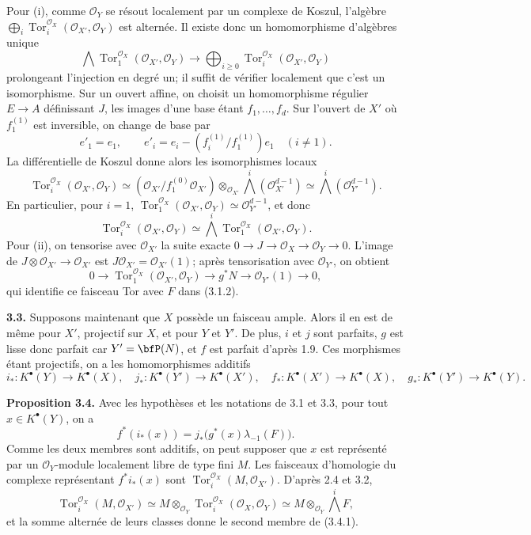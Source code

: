 \documentclass[11pt]{article}
\newcommand{\Tor}{\operatorname{Tor}}
\providecommand{\Tor}{\operatorname{Tor}}
\providecommand{\cO}{\mathcal O}
\begin{document}
Pour (i), comme \(\cO_Y\) se résout localement par un complexe de Koszul, l'algèbre \(\bigoplus_i\Tor_i^{\cO_X}(\cO_{X'},\cO_Y)\) est alternée. Il existe donc un homomorphisme d'algèbres unique
\begin{equation}\tag{3.2.1}
\bigwedge \Tor_1^{\cO_X}(\cO_{X'},\cO_Y)
\longrightarrow
\bigoplus_{i\ge0}\Tor_i^{\cO_X}(\cO_{X'},\cO_Y)
\end{equation}
prolongeant l'injection en degré un; il suffit de vérifier localement que c'est un isomorphisme. Sur un ouvert affine, on choisit un homomorphisme régulier \(E\to A\) définissant \(J\), les images d'une base étant \(f_1,\ldots,f_d\). Sur l'ouvert de \(X'\) où \(f_1^{(1)}\) est inversible, on change de base par
\[
e'_1=e_1,
\qquad
e'_i=e_i-(f_i^{(1)}/f_1^{(1)})e_1\quad(i\ne1).
\]
La différentielle de Koszul donne alors les isomorphismes locaux
\begin{equation}\tag{3.2.2}
\Tor_i^{\cO_X}(\cO_{X'},\cO_Y)
\simeq
(\cO_{X'}/f_1^{(0)}\cO_{X'})\otimes_{\cO_{X'}}
\bigwedge^i(\cO_{X'}^{d-1})
\simeq
\bigwedge^i(\cO_{Y'}^{d-1}).
\end{equation}
En particulier, pour \(i=1\), \(\Tor_1^{\cO_X}(\cO_{X'},\cO_Y)\simeq \cO_{Y'}^{d-1}\), et donc
\begin{equation}\tag{3.2.3}
\Tor_i^{\cO_X}(\cO_{X'},\cO_Y)
\simeq
\bigwedge^i\Tor_1^{\cO_X}(\cO_{X'},\cO_Y).
\end{equation}
Pour (ii), on tensorise avec \(\cO_{X'}\) la suite exacte \(0\to J\to\cO_X\to\cO_Y\to0\). L'image de \(J\otimes\cO_{X'}\to\cO_{X'}\) est \(J\cO_{X'}=\cO_{X'}(1)\); après tensorisation avec \(\cO_{Y'}\), on obtient
\begin{equation}\tag{3.2.4}
0\to \Tor_1^{\cO_X}(\cO_{X'},\cO_Y)\to g^*N\to\cO_{Y'}(1)
\to0,
\end{equation}
qui identifie ce faisceau Tor avec \(F\) dans (3.1.2).

\textbf{3.3.} Supposons maintenant que \(X\) possède un faisceau ample. Alors il en est de même pour \(X'\), projectif sur \(X\), et pour \(Y\) et \(Y'\). De plus, \(i\) et \(j\) sont parfaits, \(g\) est lisse donc parfait car \(Y'=\bfP(N)\), et \(f\) est parfait d'après 1.9. Ces morphismes étant projectifs, on a les homomorphismes additifs
\[
i_*:K^\bullet(Y)\to K^\bullet(X),\quad
j_*:K^\bullet(Y')\to K^\bullet(X'),\quad
f_*:K^\bullet(X')\to K^\bullet(X),\quad
g_*:K^\bullet(Y')\to K^\bullet(Y).
\]

\textbf{Proposition 3.4.} Avec les hypothèses et les notations de 3.1 et 3.3, pour tout \(x\in K^\bullet(Y)\), on a
\begin{equation}\tag{3.4.1}
f^*(i_*(x))=j_*\bigl(g^*(x)\lambda_{-1}(F)\bigr).
\end{equation}
Comme les deux membres sont additifs, on peut supposer que \(x\) est représenté par un \(\cO_Y\)-module localement libre de type fini \(M\). Les faisceaux d'homologie du complexe représentant \(f^*i_*(x)\) sont \(\Tor_i^{\cO_X}(M,\cO_{X'})\). D'après 2.4 et 3.2,
\[
\Tor_i^{\cO_X}(M,\cO_{X'})
\simeq M\otimes_{\cO_Y}\Tor_i^{\cO_X}(\cO_X,\cO_Y)
\simeq M\otimes_{\cO_Y}\bigwedge^iF,
\]
et la somme alternée de leurs classes donne le second membre de (3.4.1).
\end{document}
